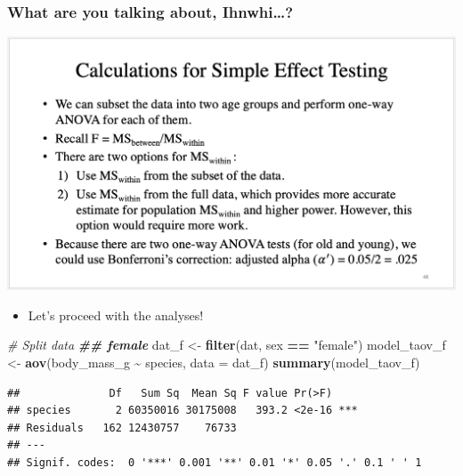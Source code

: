 \documentclass[
]{book}
\newenvironment{Shaded}{\begin{snugshade}}{\end{snugshade}}
\newcommand{\AttributeTok}[1]{\textcolor[rgb]{0.13,0.29,0.53}{#1}}
\newcommand{\CommentTok}[1]{\textcolor[rgb]{0.56,0.35,0.01}{\textit{#1}}}
\newcommand{\DocumentationTok}[1]{\textcolor[rgb]{0.56,0.35,0.01}{\textbf{\textit{#1}}}}
\newcommand{\FunctionTok}[1]{\textcolor[rgb]{0.13,0.29,0.53}{\textbf{#1}}}
\newcommand{\NormalTok}[1]{#1}
\newcommand{\OtherTok}[1]{\textcolor[rgb]{0.56,0.35,0.01}{#1}}
\newcommand{\SpecialCharTok}[1]{\textcolor[rgb]{0.81,0.36,0.00}{\textbf{#1}}}
\newcommand{\StringTok}[1]{\textcolor[rgb]{0.31,0.60,0.02}{#1}}
\providecommand{\tightlist}{%
  \setlength{\itemsep}{0pt}\setlength{\parskip}{0pt}}
\begin{document}
\subsubsection{What are you talking about, Ihnwhi\ldots?}\label{what-are-you-talking-about-ihnwhi}

\includegraphics{./img/slide.png}

\begin{itemize}
\tightlist
\item
  Let's proceed with the analyses!
\end{itemize}

\begin{Shaded}
\begin{Highlighting}[]
\CommentTok{\# Split data}
\DocumentationTok{\#\# female}
\NormalTok{dat\_f }\OtherTok{\textless{}{-}} \FunctionTok{filter}\NormalTok{(dat, sex }\SpecialCharTok{==} \StringTok{"female"}\NormalTok{)}
\NormalTok{model\_taov\_f }\OtherTok{\textless{}{-}} \FunctionTok{aov}\NormalTok{(body\_mass\_g }\SpecialCharTok{\textasciitilde{}}\NormalTok{ species, }\AttributeTok{data =}\NormalTok{ dat\_f)}
\FunctionTok{summary}\NormalTok{(model\_taov\_f)}
\end{Highlighting}
\end{Shaded}

\begin{verbatim}
##              Df   Sum Sq  Mean Sq F value Pr(>F)    
## species       2 60350016 30175008   393.2 <2e-16 ***
## Residuals   162 12430757    76733                   
## ---
## Signif. codes:  0 '***' 0.001 '**' 0.01 '*' 0.05 '.' 0.1 ' ' 1
\end{verbatim}
\end{document}
